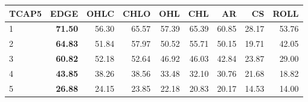 \begin{table}[ht]
\centering
\begin{tabular}{lrrrrrrrr}
  \hline
TCAP5 & EDGE & OHLC & CHLO & OHL & CHL & AR & CS & ROLL \\ 
  \hline
1 & \textbf{71.50} & 56.30 & 65.57 & 57.39 & 65.39 & 60.85 & 28.17 & 53.76 \\ 
  2 & \textbf{64.83} & 51.84 & 57.97 & 50.52 & 55.71 & 50.15 & 19.71 & 42.05 \\ 
  3 & \textbf{60.82} & 52.18 & 52.64 & 46.92 & 46.03 & 42.84 & 23.87 & 29.00 \\ 
  4 & \textbf{43.85} & 38.26 & 38.56 & 33.48 & 32.10 & 30.76 & 21.68 & 18.82 \\ 
  5 & \textbf{26.88} & 24.15 & 23.85 & 22.18 & 20.83 & 20.17 & 14.53 & 14.00 \\ 
   \hline
\end{tabular}
\end{table}
